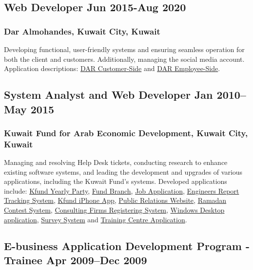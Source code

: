 \documentclass[11pt]{article}
\begin{document}
\vspace{0.8em} %

\subsection{Web Developer \hfill \normalfont Jun 2015-Aug 2020}  
\subsubsection{Dar Almohandes,  Kuwait City, Kuwait} 
 \noindent
Developing functional, user-friendly systems and ensuring seamless operation for both the client and customers. Additionally, managing the social media account. Application descriptions: \hyperref[sec: DARMEKW-C]{DAR Customer-Side} and \hyperref[sec: DARMEKW-S]{DAR Employee-Side}. 

\vspace{0.8em} %

\subsection{System Analyst and Web Developer \hfill \normalfont Jan 2010–May 2015}  
\subsubsection{Kuwait Fund for Arab Economic Development, Kuwait City, Kuwait}
 \noindent
Managing and resolving Help Desk tickets, conducting research to enhance existing software systems, and leading the development and upgrades of various applications, including the Kuwait Fund’s systems. Developed applications include:  \hyperref[sec: Kfund-Party]{Kfund Yearly Party}, \hyperref[sec: Kfund-BranchSystem]{Fund Branch}, \hyperref[sec: Kfund-Job]{Job Application}, \hyperref[sec: Kfund-TrackingSystem]{Engineers Report Tracking System}, \hyperref[sec: Kfund-iphone]{Kfund iPhone App}, \hyperref[sec: Kfund-PublicRelations]{Public Relations Website}, \hyperref[sec: Kfund-Ramadan]{Ramadan Contest System}, \hyperref[sec: Kfund-ConsultingFirms]{Consulting Firms Registering System}, \hyperref[sec: Kfund-desktop]{Windows Desktop application}, \hyperref[sec: Kfund-Survey]{Survey System} and \hyperref[sec: Kfund-Training]{Training Centre Application}.


\vspace{0.8em} %

\subsection{E-business Application Development Program - Trainee \hfill \normalfont Apr 2009–Dec 2009}  
\end{document}

